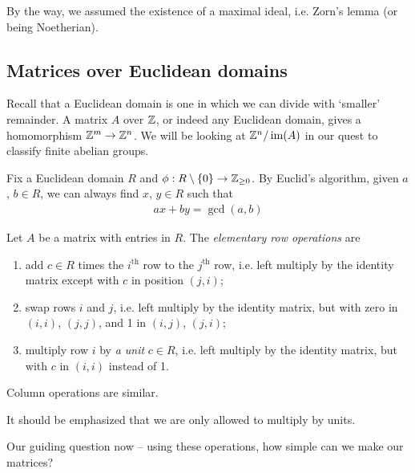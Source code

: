 \documentclass{../../template/note}
\begin{document}
    \begin{remark*}
        By the way, we assumed the existence of a maximal ideal, i.e. Zorn's lemma (or being Noetherian).
    \end{remark*}
    
    \subsection{Matrices over Euclidean domains}

    Recall that a Euclidean domain is one in which we can divide with `smaller' remainder. A matrix $A$ over $\mathbb Z$, or indeed any Euclidean domain, gives a homomorphism $\mathbb Z^m \to \mathbb Z^n$. We will be looking at $\mathbb Z^n/\operatorname{im}(A)$ in our quest to classify finite abelian groups.

    Fix a Euclidean domain $R$ and $\phi: R \setminus \{0\} \to \mathbb Z_{\geq 0}$. By Euclid's algorithm, given $a$, $b \in R$, we can always find $x$, $y \in R$ such that
    \begin{align*}
        ax + by = \gcd(a, b)
    \end{align*}
    
    \begin{definition}
        Let $A$ be a matrix with entries in $R$. The \emph{elementary row operations} are
        \begin{enumerate}[label=\protect\circled{\arabic*}]
            \item add $c \in R$ times the $i^\text{th}$ row to the $j^\text{th}$ row, i.e. left multiply by the identity matrix except with $c$ in position $(j, i)$;
            \item swap rows $i$ and $j$, i.e. left multiply by the identity matrix, but with zero in $(i, i)$, $(j, j)$, and 1 in $(i, j)$, $(j, i)$;
            \item multiply row $i$ by \emph{a unit} $c \in R$, i.e. left multiply by the identity matrix, but with $c$ in $(i, i)$ instead of 1.
        \end{enumerate}
        Column operations are similar.        
    \end{definition}
    
    \begin{remark*}
        It should be emphasized that we are only allowed to multiply by units.
    \end{remark*}
    
    Our guiding question now -- using these operations, how simple can we make our matrices?
    
\end{document}
